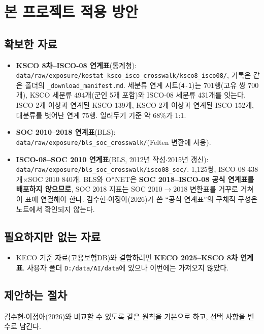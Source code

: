 \documentclass[11pt]{article}
\begin{document}
\section{본 프로젝트 적용 방안}

\subsection{확보한 자료}

\begin{itemize}
  \item \textbf{KSCO 8차–ISCO-08 연계표}(통계청): \texttt{data/raw/exposure/kostat\_ksco\_isco\_crosswalk/ksco8\_isco08/}, 기록은 같은 폴더의 \texttt{\_download\_manifest.md}. 세분류 연계 시트(\texttt{4-1})는 701행(고유 쌍 700개), KSCO 세분류 494개(군인 5개 포함)와 ISCO-08 세분류 431개를 잇는다. ISCO 2개 이상과 연계된 KSCO 139개, KSCO 2개 이상과 연계된 ISCO 152개, 대분류를 벗어난 연계 75행. 일러두기 기준 약 68\%가 1:1.
  \item \textbf{SOC 2010–2018 연계표}(BLS): \texttt{data/raw/exposure/bls\_soc\_crosswalk/}(Felten 변환에 사용).
  \item \textbf{ISCO-08–SOC 2010 연계표}(BLS, 2012년 작성$\cdot$2015년 갱신): \texttt{data/raw/exposure/bls\_soc\_crosswalk/isco08\_soc/}. 1{,}125쌍, ISCO-08 438개$\times$SOC 2010 840개. BLS와 O*NET은 \textbf{SOC 2018–ISCO-08 공식 연계표를 배포하지 않으므로}, SOC 2018 지표는 SOC 2010$\to$2018 변환표를 거꾸로 거쳐 이 표에 연결해야 한다. 김수현$\cdot$이정아(2026)가 쓴 ``공식 연계표''의 구체적 구성은 노트에서 확인되지 않는다.
\end{itemize}

\subsection{필요하지만 없는 자료}

\begin{itemize}
  \item KECO 기준 자료(고용보험DB)와 결합하려면 \textbf{KECO 2025–KSCO 8차 연계표}. 사용자 폴더 \texttt{D:/data/AI/data}에 있으나 이번에는 가져오지 않았다.
\end{itemize}

\subsection{제안하는 절차}

김수현$\cdot$이정아(2026)와 비교할 수 있도록 같은 원칙을 기본으로 하고, 선택 사항을 변수로 남긴다.
\end{document}
